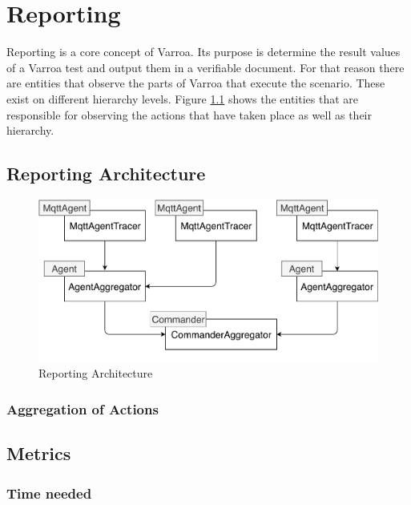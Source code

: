 \chapter{Reporting}\label{sec:Reporting}
Reporting is a core concept of Varroa.
Its purpose is determine the result values of a Varroa test and output them in a verifiable document.
For that reason there are entities that observe the parts of Varroa that execute the scenario.
These exist on different hierarchy levels.
Figure \ref{fig:ReportingArchitecture} shows the entities that are responsible for observing the actions that have taken place as well as their hierarchy.

\section{Reporting Architecture}
\begin{figure}[H]
	\begin{center}
		\includegraphics[scale=0.8]{Resources/PDF/ReportingArchitecture}
		\caption{Reporting Architecture}
		\label{fig:ReportingArchitecture}
	\end{center}
\end{figure}



\subsection{Aggregation of Actions}

\section{Metrics}

\subsection{Time needed}



